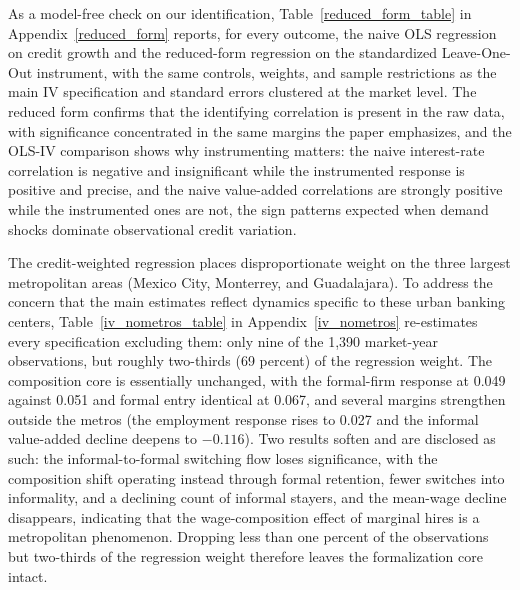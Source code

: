 \documentclass[12pt]{article}
\begin{document}
As a model-free check on our identification, Table~\ref{reduced_form_table} in Appendix~\ref{reduced_form} reports, for every outcome, the naive OLS regression on credit growth and the reduced-form regression on the standardized Leave-One-Out instrument, with the same controls, weights, and sample restrictions as the main IV specification and standard errors clustered at the market level. The reduced form confirms that the identifying correlation is present in the raw data, with significance concentrated in the same margins the paper emphasizes, and the OLS-IV comparison shows why instrumenting matters: the naive interest-rate correlation is negative and insignificant while the instrumented response is positive and precise, and the naive value-added correlations are strongly positive while the instrumented ones are not, the sign patterns expected when demand shocks dominate observational credit variation.

The credit-weighted regression places disproportionate weight on the three largest metropolitan areas (Mexico City, Monterrey, and Guadalajara). To address the concern that the main estimates reflect dynamics specific to these urban banking centers, Table~\ref{iv_nometros_table} in Appendix~\ref{iv_nometros} re-estimates every specification excluding them: only nine of the 1,390 market-year observations, but roughly two-thirds (69 percent) of the regression weight. The composition core is essentially unchanged, with the formal-firm response at 0.049 against 0.051 and formal entry identical at 0.067, and several margins strengthen outside the metros (the employment response rises to 0.027 and the informal value-added decline deepens to $-0.116$). Two results soften and are disclosed as such: the informal-to-formal switching flow loses significance, with the composition shift operating instead through formal retention, fewer switches into informality, and a declining count of informal stayers, and the mean-wage decline disappears, indicating that the wage-composition effect of marginal hires is a metropolitan phenomenon. Dropping less than one percent of the observations but two-thirds of the regression weight therefore leaves the formalization core intact.
\end{document}
